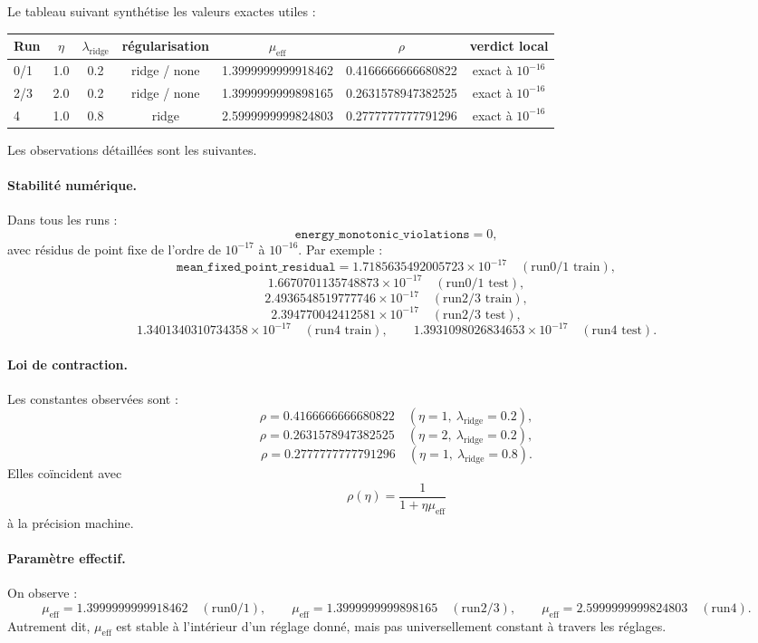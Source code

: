 Le tableau suivant synthétise les valeurs exactes utiles :

\begin{center}
\small
\begin{tabular}{lcccccc}
\hline
Run & \(\eta\) & \(\lambda_{\mathrm{ridge}}\) & régularisation & \(\mu_{\mathrm{eff}}\) & \(\rho\) & verdict local \\
\hline
0/1 & 1.0 & 0.2 & ridge / none & 1.3999999999918462 & 0.4166666666680822 & exact à \(10^{-16}\) \\
2/3 & 2.0 & 0.2 & ridge / none & 1.3999999999898165 & 0.2631578947382525 & exact à \(10^{-16}\) \\
4   & 1.0 & 0.8 & ridge & 2.5999999999824803 & 0.2777777777791296 & exact à \(10^{-16}\) \\
\hline
\end{tabular}
\end{center}

Les observations détaillées sont les suivantes.

\paragraph{Stabilité numérique.}
Dans tous les runs :
\[
\texttt{energy\_monotonic\_violations}=0,
\]
avec résidus de point fixe de l’ordre de \(10^{-17}\) à \(10^{-16}\). Par exemple :
\[
\texttt{mean\_fixed\_point\_residual}
=
1.7185635492005723\times 10^{-17}\quad(\text{run0/1 train}),
\]
\[
1.6670701135748873\times 10^{-17}\quad(\text{run0/1 test}),
\]
\[
2.4936548519777746\times 10^{-17}\quad(\text{run2/3 train}),
\]
\[
2.394770042412581\times 10^{-17}\quad(\text{run2/3 test}),
\]
\[
1.3401340310734358\times 10^{-17}\quad(\text{run4 train}),
\qquad
1.3931098026834653\times 10^{-17}\quad(\text{run4 test}).
\]

\paragraph{Loi de contraction.}
Les constantes observées sont :
\[
\rho=0.4166666666680822\quad(\eta=1,\ \lambda_{\mathrm{ridge}}=0.2),
\]
\[
\rho=0.2631578947382525\quad(\eta=2,\ \lambda_{\mathrm{ridge}}=0.2),
\]
\[
\rho=0.2777777777791296\quad(\eta=1,\ \lambda_{\mathrm{ridge}}=0.8).
\]
Elles coïncident avec
\[
\rho(\eta)=\frac{1}{1+\eta\mu_{\mathrm{eff}}}
\]
à la précision machine.

\paragraph{Paramètre effectif.}
On observe :
\[
\mu_{\mathrm{eff}}=1.3999999999918462\quad(\text{run0/1}),
\qquad
\mu_{\mathrm{eff}}=1.3999999999898165\quad(\text{run2/3}),
\qquad
\mu_{\mathrm{eff}}=2.5999999999824803\quad(\text{run4}).
\]
Autrement dit, \(\mu_{\mathrm{eff}}\) est stable à l’intérieur d’un réglage donné, mais pas universellement constant à travers les réglages.

